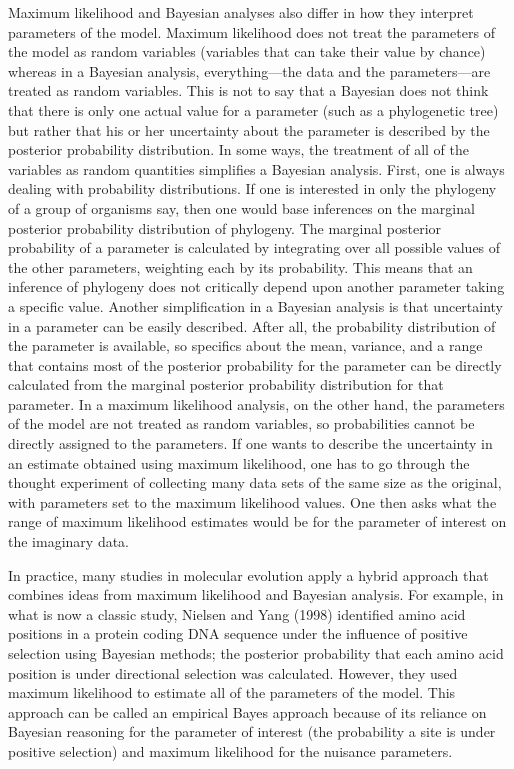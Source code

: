 \documentclass{svmult}
\begin{document}
Maximum likelihood and Bayesian analyses also differ in how they interpret parameters of the model.
Maximum likelihood does not treat the parameters of the model as random variables (variables that
can take their value by chance) whereas in a Bayesian analysis, everything---the data and the
parameters---are treated as random variables. This is not to say that a Bayesian does not think
that there is only one actual value for a parameter (such as a phylogenetic tree) but rather that
his or her uncertainty about the parameter is described by the posterior probability distribution.
In some ways, the treatment of all of the variables as random quantities simplifies a Bayesian
analysis.  First, one is always dealing with probability distributions. If one is interested in
only the phylogeny of a group of organisms say, then one would base inferences on the marginal
posterior probability distribution of phylogeny. The marginal posterior probability of a parameter
is calculated by integrating over all possible values of the other parameters, weighting each by
its probability.  This means that an inference of phylogeny does not critically depend upon another
parameter taking a specific value. Another simplification in a Bayesian analysis is that
uncertainty in a parameter can be easily described. After all, the probability distribution of the
parameter is available, so specifics about the mean, variance, and a range that contains most of
the posterior probability for the parameter can be directly calculated from the marginal posterior
probability distribution for that parameter. In a maximum likelihood analysis, on the other hand,
the parameters of the model are not treated as random variables, so probabilities cannot be
directly assigned to the parameters. If one wants to describe the uncertainty in an estimate
obtained using maximum likelihood, one has to go through the thought experiment of collecting many
data sets of the same size as the original, with parameters set to the maximum likelihood values.
One then asks what the range of maximum likelihood estimates would be for the parameter of interest
on the imaginary data.

In practice, many studies in molecular evolution apply a hybrid approach that combines ideas from
maximum likelihood and Bayesian analysis. For example, in what is now a classic study, Nielsen and
Yang (1998) identified amino acid positions in a protein coding DNA sequence under the influence of
positive selection using Bayesian methods; the posterior probability that each amino acid position
is under directional selection was calculated. However, they used maximum likelihood to estimate
all of the parameters of the model. This approach can be called an empirical Bayes approach because
of its reliance on Bayesian reasoning for the parameter of interest (the probability a site is
under positive selection) and maximum likelihood for the nuisance parameters.
\end{document}
